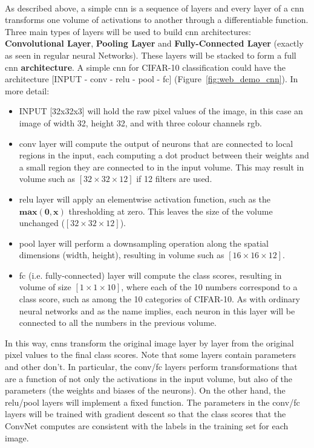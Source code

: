 \paragraph*{}
As described above, a simple \acrshort{cnn} is a sequence of layers and every
layer of a \acrshort{cnn} transforms one volume of activations to another
through a differentiable function. Three main types of layers will be used to
build \acrshort{cnn} architectures: \textbf{Convolutional Layer},
\textbf{Pooling Layer} and \textbf{Fully-Connected Layer} (exactly as seen in
regular neural Networks). These layers will be stacked to form a full
\acrshort{cnn} \textbf{architecture}. A simple \acrshort{cnn} for CIFAR-10
classification could have the architecture [INPUT - \acrshort{conv} -
\acrshort{relu} - \acrshort{pool} - \acrshort{fc}]
(Figure~\ref{fig:web_demo_cnn}).
In more detail:
\begin{itemize}
    \item INPUT [32x32x3] will hold the raw pixel values of the image, in this
    case an image of width 32, height 32, and with three colour channels
    \acrshort{rgb}.
    \item \acrshort{conv} layer will compute the output of neurons that are
    connected to local regions in the input, each computing a dot product
    between their weights and a small region they are connected to in the input
    volume. This may result in volume such as $[32\times32\times12]$ if 12
    filters are used.
    \item \acrshort{relu} layer will apply an elementwise activation function,
    such as the $\boldsymbol{max(0, x)}$ thresholding at zero. This leaves the
    size of the volume unchanged ($[32\times32\times12]$).
    \item \acrshort{pool} layer will perform a downsampling operation along the
    spatial dimensions (width, height), resulting in volume such as
    $[16\times16\times12]$.
    \item \acrshort{fc} (i.e. fully-connected) layer will compute the class
    scores, resulting in volume of size $[1\times1\times10]$, where each of the
    10 numbers correspond to a class score, such as among the 10 categories of
    CIFAR-10. As with ordinary neural networks and as the name implies, each
    neuron in this layer will be connected to all the numbers in the previous
    volume.
\end{itemize}


In this way, \acrshort{cnn}s transform the original image layer by layer from
the original pixel values to the final class scores. Note that some layers
contain parameters and other don’t. In particular, the
\acrshort{conv}/\acrshort{fc} layers perform transformations that are a
function of not only the activations in the input volume, but also of the
parameters (the weights and biases of the neurons). On the other hand,
the \acrshort{relu}/\acrshort{pool} layers will implement a fixed function.
The parameters in the \acrshort{conv}/\acrshort{fc} layers will be trained with
gradient descent so that the class scores that the ConvNet computes are
consistent with the labels in the training set for each image.


